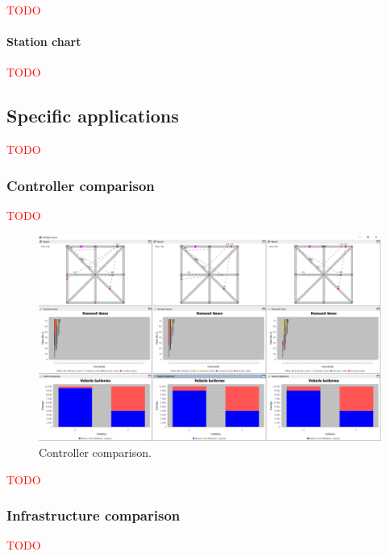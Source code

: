 \documentclass[10pt,twocolumn]{article}
\begin{document}
\textcolor{red}{TODO}

\paragraph{Station chart}

\textcolor{red}{TODO}

\subsection{Specific applications}
\label{sec:application}

\textcolor{red}{TODO}

\subsubsection{Controller comparison}
\label{sec:controller-comparison}

\textcolor{red}{TODO}

\begin{figure}[!ht]
    \includegraphics[width=\columnwidth]{../../screenshots/controller-comparison.png}
    \caption{Controller comparison.}
    \label{fig:controller-comparison}
\end{figure}

\textcolor{red}{TODO}

\subsubsection{Infrastructure comparison}
\label{sec:infrastructure-comparison}

\textcolor{red}{TODO}
\end{document}
